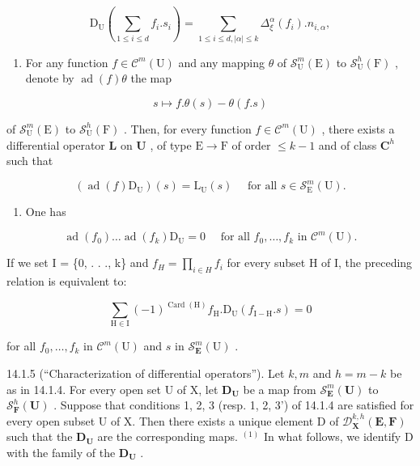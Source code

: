 \[
\mathrm{D} _ {\mathrm{U}} \left(\sum_ {1 \leqslant i \leqslant d} f _ {i}. s _ {i}\right) = \sum_ {1 \leqslant i \leqslant d, | \alpha | \leqslant k} \Delta_ {\xi} ^ {\alpha} (f _ {i}). n _ {i, \alpha},
\]

\begin{enumerate}
\def\labelenumi{(\arabic{enumi})}
\setcounter{enumi}{3}
\tightlist
\item
  For any function \(f \in \mathcal{C}^m(\mathrm{U})\) and any mapping \(\theta\) of \(\mathcal{S}_{\mathrm{U}}^{m}(\mathrm{E})\) to \(\mathcal{S}_{\mathrm{U}}^{h}(\mathrm{F})\) , denote by \(\operatorname{ad}(f)\theta\) the map
\end{enumerate}

\[
s \mapsto f. \theta (s) - \theta (f. s)
\]

of \(\mathcal{S}_{\mathrm{U}}^{m}(\mathrm{E})\) to \(\mathcal{S}_{\mathrm{U}}^{h}(\mathrm{F})\) . Then, for every function \(f \in \mathcal{C}^{m}(\mathrm{U})\) , there exists a differential operator \(\mathbf{L}\) on \(\mathbf{U}\) , of type \(\mathrm{E} \to \mathrm{F}\) of order \(\leqslant k - 1\) and of class \(\mathbf{C}^{h}\) such that

\[
(\operatorname{ad} (f) \mathrm{D} _ {\mathrm{U}}) (s) = \mathrm{L} _{\mathrm{U}}(s) \quad \text { for all } s \in \mathscr{S}_{\mathrm{E}}^{m}(\mathrm{U}).
\]

\begin{enumerate}
\def\labelenumi{(\arabic{enumi})}
\setcounter{enumi}{4}
\tightlist
\item
  One has
\end{enumerate}

\[
\operatorname{ad} (f _ {0}) \dots \operatorname{ad} (f _ {k}) \mathrm{D} _ {\mathrm{U}} = 0 \quad \text { for all } f _ {0}, \dots , f _ {k} \text { in } \mathscr {C} ^ {m} (\mathrm{U}).
\]

If we set I = \{0, . . ., k\} and \(f_{H} = \prod_{i \in H} f_i\) for every subset H of I, the preceding relation is equivalent to:

\[
\sum_ {\mathrm{H} \in \mathrm{I}} (- 1) ^ {\operatorname{Card} (\mathrm{H})} f _ {\mathrm{H}}. \mathrm{D} _ {\mathrm{U}} (f _ {\mathrm{I-H}}. s) = 0
\]

for all \(f_{0},\ldots,f_{k}\) in \(\mathcal{C}^{m}(\mathrm{U})\) and \(s\) in \(\mathcal{S}_{\mathbf{E}}^{m}(\mathrm{U})\) .

14.1.5 (“Characterization of differential operators”). Let \(k, m\) and \(h = m - k\) be as in 14.1.4. For every open set U of X, let \(\mathbf{D}_{\mathbf{U}}\) be a map from \(\mathcal{S}_{\mathbf{E}}^{m}(\mathbf{U})\) to \(\mathcal{S}_{\mathbf{F}}^{h}(\mathbf{U})\) . Suppose that conditions 1, 2, 3 (resp. 1, 2, 3') of 14.1.4 are satisfied for every open subset U of X. Then there exists a unique element D of \(\mathcal{D}_{\mathbf{X}}^{k,h}(\mathbf{E},\mathbf{F})\) such that the \(\mathbf{D}_{\mathbf{U}}\) are the corresponding maps. \(^{(1)}\) In what follows, we identify D with the family of the \(\mathbf{D}_{\mathbf{U}}\) .

